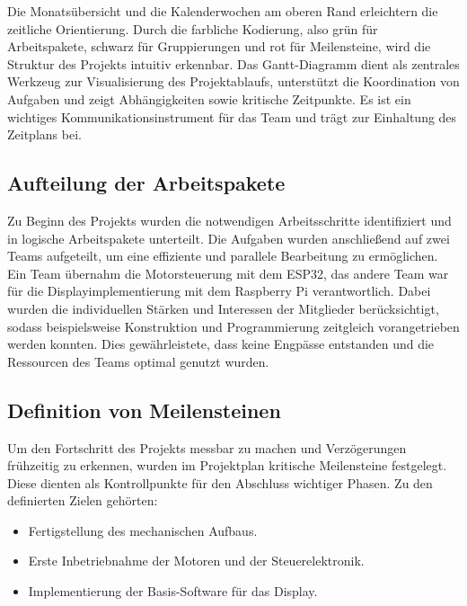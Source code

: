 Die Monatsübersicht und die Kalenderwochen am oberen Rand erleichtern die zeitliche Orientierung. Durch die farbliche Kodierung, also grün für Arbeitspakete, schwarz für Gruppierungen und rot für Meilensteine, wird die Struktur des Projekts intuitiv erkennbar. Das Gantt-Diagramm dient als zentrales Werkzeug zur Visualisierung des Projektablaufs, unterstützt die Koordination von Aufgaben und zeigt Abhängigkeiten sowie kritische Zeitpunkte. Es ist ein wichtiges Kommunikationsinstrument für das Team und trägt zur Einhaltung des Zeitplans bei.

\subsection{Aufteilung der Arbeitspakete}
\label{cha:Aufteilung der Arbeitspakete}

Zu Beginn des Projekts wurden die notwendigen Arbeitsschritte identifiziert und in logische Arbeitspakete unterteilt. Die Aufgaben wurden anschließend auf zwei Teams aufgeteilt, um eine effiziente und parallele Bearbeitung zu ermöglichen. Ein Team übernahm die Motorsteuerung mit dem ESP32, das andere Team war für die Displayimplementierung mit dem Raspberry Pi verantwortlich. Dabei wurden die individuellen Stärken und Interessen der Mitglieder berücksichtigt, sodass beispielsweise Konstruktion und Programmierung zeitgleich vorangetrieben werden konnten. Dies gewährleistete, dass keine Engpässe entstanden und die Ressourcen des Teams optimal genutzt wurden.

\subsection{Definition von Meilensteinen}
\label{cha:Definition von Meilensteinen}

Um den Fortschritt des Projekts messbar zu machen und Verzögerungen frühzeitig zu erkennen, wurden im Projektplan kritische Meilensteine festgelegt. Diese dienten als Kontrollpunkte für den Abschluss wichtiger Phasen. Zu den definierten Zielen gehörten:

\begin{itemize}
	\item Fertigstellung des mechanischen Aufbaus.
	\item Erste Inbetriebnahme der Motoren und der Steuerelektronik.
	\item Implementierung der Basis-Software für das Display.
	
\end{itemize}

